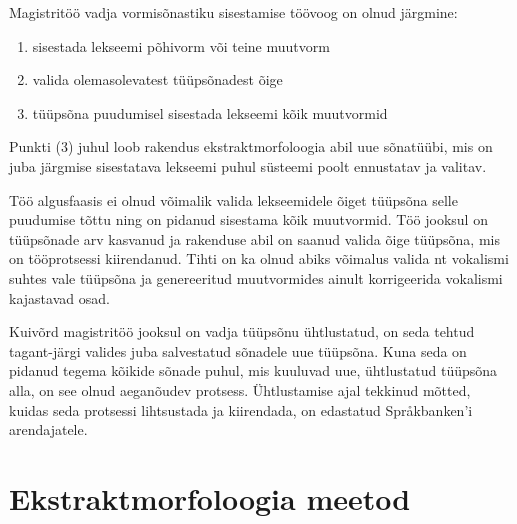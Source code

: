 \documentclass[12pt,a4paper]{article}
\begin{document}
Magistritöö vadja vormisõnastiku sisestamise töövoog on olnud järgmine:
\begin{enumerate}
\item sisestada lekseemi põhivorm või teine muutvorm
\item valida olemasolevatest tüüpsõnadest õige
\item tüüpsõna puudumisel sisestada lekseemi kõik muutvormid
\end{enumerate}

Punkti (3) juhul loob rakendus ekstrakt\-morfoloogia abil uue sõnatüübi, mis on juba järgmise sisestatava lekseemi puhul süsteemi poolt ennustatav ja valitav.

Töö algusfaasis ei olnud võimalik valida lekseemidele õiget tüüpsõna selle puudumise tõttu ning on pidanud sisestama kõik muutvormid. Töö jooksul on tüüpsõnade arv kasvanud ja rakenduse abil on saanud valida õige tüüpsõna, mis on töö\-protsessi kiirendanud. Tihti on ka olnud abiks võimalus valida nt vokalismi suhtes vale tüüpsõna ja genereeritud muutvormides ainult korrigeerida vokalismi kajastavad osad.

Kuivõrd magistritöö jooksul on vadja tüüpsõnu ühtlustatud, on seda tehtud tagant-järgi valides juba salvestatud sõnadele uue tüüpsõna. Kuna seda on pidanud tegema kõikide sõnade puhul, mis kuuluvad uue, ühtlustatud tüüpsõna alla, on see olnud aega\-nõudev protsess. Ühtlustamise ajal tekkinud mõtted, kuidas seda protsessi lihtsustada ja kiirendada, on edastatud Språkbanken'i arendajatele.


\newpage
\section{Ekstraktmorfoloogia meetod}
\label{sec:ekstraktmorfoloogia-meetod}


\end{document}
